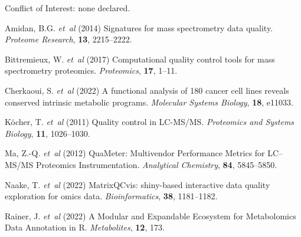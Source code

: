 \documentclass{bioinfo}
\begin{document}
Conflict of Interest: none declared.




\begin{thebibliography}{}

Amidan, B.G. \textit{et~al} (2014) Signatures for mass spectrometry data
quality.
\textit{Proteome Research}, \textbf{13}, 2215--2222.


Bittremieux, W. \textit{et~al} (2017) Computational quality control tools for
mass spectrometry proteomics.
\textit{Proteomics}, \textbf{17}, 1--11.

Cherkaoui, S. \textit{et~al} (2022) A functional analysis of 180 cancer cell
lines reveals conserved intrinsic metabolic programs.
\textit{Molecular Systems Biology}, \textbf{18}, e11033.

K\"ocher, T. \textit{et~al} (2011) Quality control in LC-MS/MS.
\textit{Proteomics and Systems Biology}, \textbf{11}, 1026--1030.


Ma, Z.-Q. \textit{et~al} (2012) QuaMeter: Multivendor Performance Metrics
for LC–MS/MS Proteomics Instrumentation.
\textit{Analytical Chemistry}, \textbf{84}, 5845--5850.

Naake, T. \textit{et~al} (2022) MatrixQCvis: shiny-based interactive data
quality exploration for omics data.
\textit{Bioinformatics}, \textbf{38}, 1181--1182.

Rainer, J. \textit{et~al} (2022) A Modular and Expandable Ecosystem for Metabolomics Data Annotation in R.
\textit{Metabolites}, \textbf{12}, 173.

\end{thebibliography}


%
%
%
%
%

%


\end{document}
